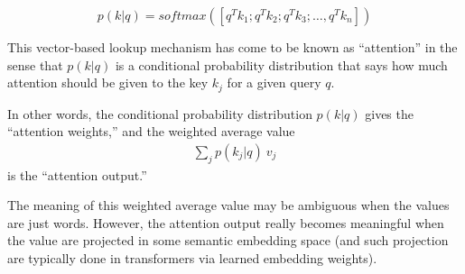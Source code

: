 \begin{equation*}
  p(k|q) ={softmax}\left(
  [q^T k_1; q^T k_2; q^T k_3; \dots, q^T k_n]
  \right)
\end{equation*}

This vector-based lookup mechanism has come to be known as ``attention'' in the sense that $p(k|q)$ is a conditional probability distribution that says how much attention should be given to the key $k_j$ for a given query $q$.







In other words, the conditional probability distribution $p(k | q)$ gives the ``attention weights,'' and the weighted average value
\begin{eqnarray}
  \sum_j p(k_j|q)\ v_j
\end{eqnarray}
is the ``attention output.''

The meaning of this weighted average value may be ambiguous when the values are just words.  However, the attention output really becomes meaningful when the value are projected in some semantic embedding space (and such projection are typically done in transformers via learned embedding weights).

